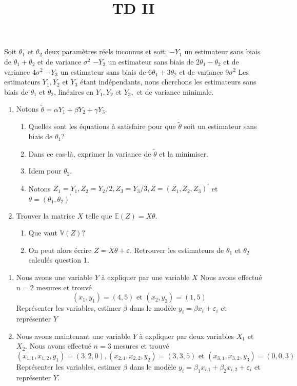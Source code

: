 \documentclass{td_um}
\title{TD II}
\providecommand{\1}{\mathds{1}}
\begin{document}
\maketitle


\exo{}  Soit $\theta_{1}$ et $\theta_{2}$ deux paramètres réels inconnus et soit:
$-Y_{1}$ un estimateur sans biais de $\theta_{1}+\theta_{2}$ et de variance $\sigma^{2}$ $-Y_{2}$ un estimateur sans biais de $2 \theta_{1}-\theta_{2}$ et de variance $4 \sigma^{2}$ $-Y_{3}$ un estimateur sans biais de $6 \theta_{1}+3 \theta_{2}$ et de variance $9 \sigma^{2}$ Les estimateurs $Y_{1}, Y_{2}$ et $Y_{3}$ étant indépendants, nous cherchons les estimateurs sans biais de $\theta_{1}$ et $\theta_{2}$, linéaires en $Y_{1}, Y_{2}$ et $Y_{3},$ et de variance minimale.
\begin{enumerate}
    \item Notons $\tilde{\theta}=\alpha Y_{1}+\beta Y_{2}+\gamma Y_{3}$.
        \begin{enumerate}
            \item Quelles sont les équations à satisfaire pour que $\tilde{\theta}$ soit un estimateur sans biais de $\theta_{1} ?$
            \item Dans ce cas-là, exprimer la variance de $\tilde{\theta}$ et la minimiser.
            \item Idem pour $\theta_{2}$.
            \item Notons $Z_{1}=Y_{1}, Z_{2}=Y_{2} / 2, Z_{3}=Y_{3} / 3, Z=\left(Z_{1}, Z_{2}, Z_{3}\right)^{\prime}$ et $\theta=\left(\theta_{1}, \theta_{2}\right)^{\prime}$
        \end{enumerate}
    \item Trouver la matrice $X$ telle que $\mathbb{E}(Z)=X \theta$.
        \begin{enumerate}
            \item Que vaut $\mathbb{V}(Z) ?$
            \item On peut alors écrire $Z=X \theta+\varepsilon .$ Retrouver les estimateurs de $\theta_{1}$ et $\theta_{2}$ calculés question 1.
    \end{enumerate}
\end{enumerate}

\exo{}
\begin{enumerate}
    \item Nous avons une variable $Y$ à expliquer par une variable $X$ Nous avons effectué $n=2$ mesures et trouvé
        $$
        \left(x_{1}, y_{1}\right)=(4,5) \text { et }\left(x_{2}, y_{2}\right)=(1,5)
        $$
        Représenter les variables, estimer $\beta$ dans le modèle $y_{i}=\beta x_{i}+\varepsilon_{i}$ et représenter $\hat{Y}$
    \item Nous avons maintenant une variable $Y$ à expliquer par deux variables $X_{1}$ et $X_{2}$. Nous avons effectué $n=3$ mesures et trouvé
        $$
        \left(x_{1,1}, x_{1,2}, y_{1}\right)=(3,2,0),\left(x_{2,1}, x_{2,2}, y_{2}\right)=(3,3,5) \text { et }\left(x_{3,1}, x_{3,2}, y_{3}\right)=(0,0,3)
        $$
        Représenter les variables, estimer $\beta$ dans le modèle $y_{i}=\beta_{1} x_{i .1}+\beta_{2} x_{i, 2}+\varepsilon_{i}$ et représenter $\hat{Y}$.
\end{enumerate}
\end{document}
